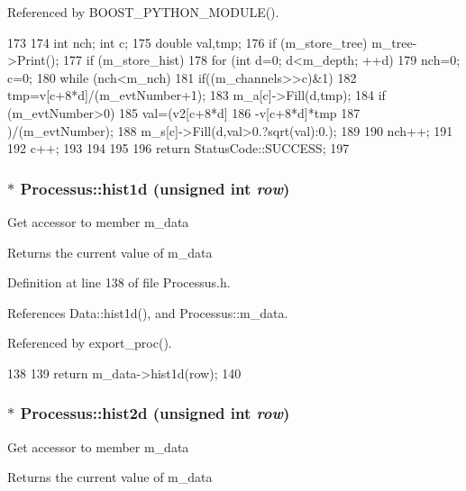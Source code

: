 Referenced by BOOST\_\-PYTHON\_\-MODULE().


\begin{DoxyCode}
173                                    {
174   int nch; int c;
175   double val,tmp;
176   if (m_store_tree) m_tree->Print();
177   if (m_store_hist){
178     for (int d=0; d<m_depth; ++d){
179       nch=0; c=0;
180       while (nch<m_nch){
181         if((m_channels>>c)&1){
182           tmp=v[c+8*d]/(m_evtNumber+1);
183           m_a[c]->Fill(d,tmp);
184           if (m_evtNumber>0){
185             val=(v2[c+8*d]
186                  -v[c+8*d]*tmp
187                  )/(m_evtNumber);
188             m_s[c]->Fill(d,val>0.?sqrt(val):0.);
189           }
190           nch++;
191         }
192         c++;
193       }
194     }
195   }
196   return StatusCode::SUCCESS;
197 }
\end{DoxyCode}
\hypertarget{classProcessus_a409227db936baff03c0462c1bcfe8069}{
\subsubsection[{hist1d}]{$\ast$ Processus::hist1d (unsigned int {\em row})}}
\label{classProcessus_a409227db936baff03c0462c1bcfe8069}
Get accessor to member m\_\-data \begin{DoxyReturn}{Returns}
the current value of m\_\-data 
\end{DoxyReturn}


Definition at line 138 of file Processus.h.

References Data::hist1d(), and Processus::m\_\-data.

Referenced by export\_\-proc().


\begin{DoxyCode}
138                                    {
139     return m_data->hist1d(row);
140   }
\end{DoxyCode}
\hypertarget{classProcessus_a73b5118cb5f2b5eaad33286183b86cfc}{
\subsubsection[{hist2d}]{$\ast$ Processus::hist2d (unsigned int {\em row})}}
\label{classProcessus_a73b5118cb5f2b5eaad33286183b86cfc}
Get accessor to member m\_\-data \begin{DoxyReturn}{Returns}
the current value of m\_\-data 
\end{DoxyReturn}


